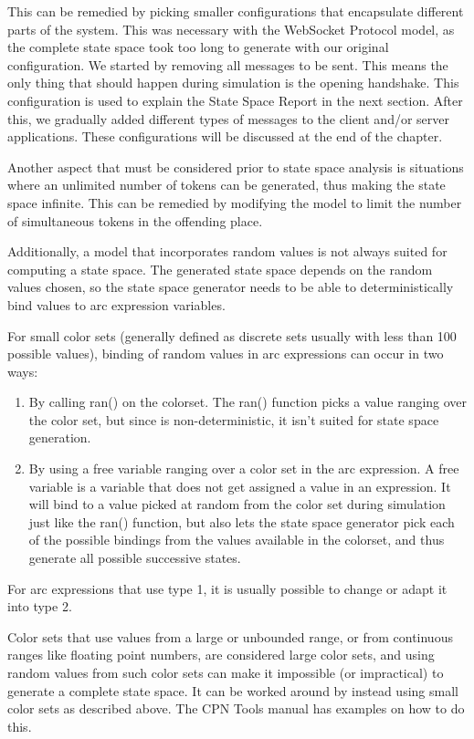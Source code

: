 		This can be remedied by picking smaller configurations that encapsulate
		different parts of the system. This was necessary with the WebSocket Protocol
		model, as the complete state space took too long to generate with our
		original configuration. 
		We started by removing all messages to be sent. This means the only thing that
		should happen during simulation is the opening handshake. This configuration
		is used to explain the State Space Report in the next section.
		After this, we gradually added different types of messages to the client
		and/or server applications. These configurations will be discussed at the end
		of the chapter.
		
		Another aspect that must be considered prior to state space analysis is
		situations where an unlimited number of tokens can be generated, thus making
		the state space infinite. This can be remedied by modifying the model to
		limit the number of simultaneous tokens in the offending place.
		
		Additionally, a model that incorporates random values is not always suited
		for computing a state space. The generated state space depends on the random
		values chosen, so the state space generator needs to be able to
		deterministically bind values to arc expression variables.
				
		For small color sets (generally defined as discrete sets usually with less
		than 100 possible values), binding of random values in arc expressions can
		occur in two ways: 
		\begin{enumerate}
		\item By calling ran() on the colorset. The ran() function picks a value
		ranging over the color set, but since is non-deterministic, it isn't
		suited for state space generation.
		\item By using a free variable ranging over a color set in the arc expression.
		A free variable is a variable that does not get assigned a value in an expression. It will 
		bind to a value picked at random from the color set during simulation just
		like the ran() function, but also lets the state space generator pick each of 
		the possible bindings from the values available in the colorset, and thus
		generate all possible successive states. 
		\end{enumerate}
		
		For arc expressions that use type 1, it is usually possible to change or
		adapt it into type 2.
		
		Color sets that use values from a large or unbounded range, or from continuous
		ranges like floating point numbers, are considered large color sets, and using
		random values from such color sets can make it impossible (or impractical)
		to generate a complete state space. It can be worked around by
		instead using small color sets as described above. The CPN Tools manual has
		examples on how to do this.
		
